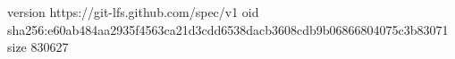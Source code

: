version https://git-lfs.github.com/spec/v1
oid sha256:e60ab484aa2935f4563ca21d3cdd6538dacb3608cdb9b06866804075c3b83071
size 830627
